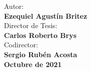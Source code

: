 \begin{center}
\vspace{1cm}
{\normalsize
Autor:\\
{\LARGE\bf Ezequiel Agustín Britez\\}
\vspace{1cm}
Director de Tesis:\\
{\Large\bf Carlos Roberto Brys}\\
Codirector:\\
{\Large\bf Sergio Rubén Acosta}\\}
\vspace{0.3cm}
\textbf{Octubre de 2021}
\end{center}

\clearpage 


